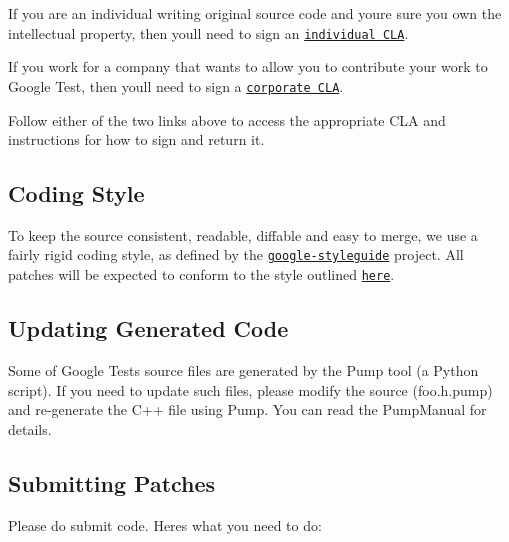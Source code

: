 \begin{DoxyItemize}
\item If you are an individual writing original source code and you\textquotesingle{}re sure you own the intellectual property, then you\textquotesingle{}ll need to sign an \href{http://code.google.com/legal/individual-cla-v1.0.html}{\tt individual C\+LA}.
\item If you work for a company that wants to allow you to contribute your work to Google Test, then you\textquotesingle{}ll need to sign a \href{http://code.google.com/legal/corporate-cla-v1.0.html}{\tt corporate C\+LA}.
\end{DoxyItemize}

Follow either of the two links above to access the appropriate C\+LA and instructions for how to sign and return it.

\subsection*{Coding Style}

To keep the source consistent, readable, diffable and easy to merge, we use a fairly rigid coding style, as defined by the \href{http://code.google.com/p/google-styleguide/}{\tt google-\/styleguide} project. All patches will be expected to conform to the style outlined \href{http://google-styleguide.googlecode.com/svn/trunk/cppguide.xml}{\tt here}.

\subsection*{Updating Generated Code}

Some of Google Test\textquotesingle{}s source files are generated by the Pump tool (a Python script). If you need to update such files, please modify the source ({\ttfamily foo.\+h.\+pump}) and re-\/generate the C++ file using Pump. You can read the Pump\+Manual for details.

\subsection*{Submitting Patches}

Please do submit code. Here\textquotesingle{}s what you need to do\+:


